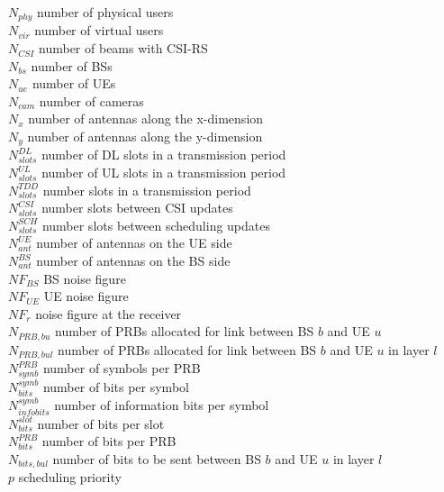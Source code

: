 $N_{phy}$ \mytab number of physical users \\
$N_{vir}$ \mytab number of virtual users \\
$N_{CSI}$ \mytab number of beams with CSI-RS\\
$N_{bs}$ \mytab number of \acsp{BS} \\
$N_{ue}$ \mytab number of \acsp{UE} \\
$N_{cam}$ \mytab number of cameras \\
$N_x$ \mytab number of antennas along the x-dimension\\
$N_y$ \mytab number of antennas along the y-dimension\\
$N^{DL}_{slots}$ \mytab number of \acs{DL} slots in a transmission period\\
$N^{UL}_{slots}$ \mytab number of \acs{UL} slots in a transmission period\\
$N^{TDD}_{slots}$ \mytab number slots in a transmission period\\
$N^{CSI}_{slots}$ \mytab number slots between \acs{CSI} updates\\
$N^{SCH}_{slots}$ \mytab number slots between scheduling updates\\
$N_{ant}^{UE}$ \mytab number of antennas on the \acs{UE} side\\
$N_{ant}^{BS}$ \mytab number of antennas on the \acs{BS} side\\
$NF_{BS}$ \mytab BS noise figure \\
$NF_{UE}$ \mytab UE noise figure\\
$NF_{r}$ \mytab noise figure at the receiver\\
$N_{PRB, bu}$ \mytab number of PRBs allocated for link between BS $b$ and UE $u$ \\
$N_{PRB, bul}$ \mytab number of PRBs allocated for link between BS $b$ and UE $u$ in layer $l$\\
$N_{symb}^{PRB}$ \mytab number of symbols per PRB \\
$N_{bits}^{symb}$ \mytab number of bits per symbol \\
$N_{info bits}^{symb}$ \mytab number of information bits per symbol \\
$N_{bits}^{slot}$ \mytab number of bits per slot \\
$N_{bits}^{PRB}$ \mytab number of bits per PRB \\
$N_{bits, bul}$ \mytab number of bits to be sent between BS $b$ and UE $u$ in layer $l$\\
$p$ \mytab scheduling priority\\

